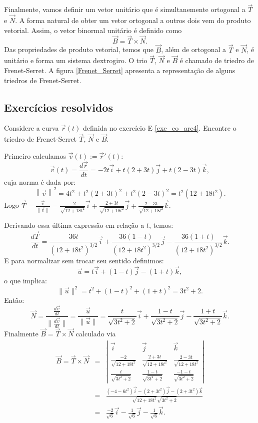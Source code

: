 Finalmente, vamos definir um vetor unitário que é simultanemente ortogonal a $\vec{T}$ e $\vec{N}$. A forma natural de obter um vetor ortogonal a outros dois vem do produto vetorial. Assim, o vetor binormal unitário é definido como
$$
\vec{B}=\vec{T}\times\vec{N}.
$$
Das propriedades de produto vetorial, temos que $\vec{B}$, além de ortogonal a $\vec{T}$ e $\vec{N}$, é unitário e forma um sistema dextrogiro. O trio $\vec{T}$, $\vec{N}$ e $\vec{B}$ é chamado de triedro de Frenet-Serret. A figura \ref{Frenet_Serret} apresenta a representação de alguns triedros de Frenet-Serret.


\subsection*{Exercícios resolvidos} %

\begin{exeresol}
  Considere a curva $\vec{r}(t)$ definida no exercício E \ref{exe_co_arc4}. Encontre o triedro de Frenet-Serret $\vec{T}$, $\vec{N}$ e $\vec{B}$.
\end{exeresol}
\begin{resol}
  Primeiro calculamos $\vec{v}(t):=\vec{r}\!'(t)$:
 $$\vec{v}(t) = \frac{d \vec{r}}{dt} = -2t \vec{i} + t(2+3t) \vec{j} + t(2-3t)\vec{k},$$
 cuja norma é dada por:
  $$\left\|\vec{v} \right\|^2 = 4t^2 + t^2(2+3t)^2 + t^2(2-3t)^2 = t^2(12+18t^2).$$
  Logo $\vec{T} = \frac{\vec{v}}{\|\vec{v}\|} = \frac{-2 }{\sqrt{12+18t^2}}\vec{i} + \frac{2+3t}{\sqrt{12+18t^2}}\vec{j} + \frac{2-3t}{\sqrt{12+18t^2}}\vec{k}$.

  Derivando essa última expressão em relação a $t$, temos:
  $$\frac{d\vec{T}}{dt} = \frac{36t}{(12+18t^2)^{3/2}} \vec{i} + \frac{36(1-t)}{(12+18t^2)^{3/2}} \vec{j} - \frac{36(1+t)}{(12+18t^2)^{3/2}} \vec{k}.$$
    E para normalizar sem trocar seu sentido definimos:
    $$\vec{u} = t \vec{i} + (1-t) \vec{j} - (1+t)\vec{k},$$
    o que implica: $$\|\vec{u}\|^2=t^2 + (1-t)^2 + (1+t)^2 = 3t^2 + 2.$$
    Então:
     $$\vec{N} = \frac{\frac{d\vec{v}}{dt}}{\|\frac{d\vec{v}}{dt}\|} = \frac{\vec{u}}{\|\vec{u}\|}=\frac{t}{\sqrt{3t^2+2}} \vec{i} + \frac{1-t}{\sqrt{3t^2+2}} \vec{j} - \frac{1+t}{\sqrt{3t^2+2}} \vec{k}.$$
     Finalmente $ \vec{B} = \vec{T} \times \vec{N}$ calculado via \begin{eqnarray*}
      \vec{B} = \vec{T} \times \vec{N} &=&
      \left| \begin{array}{ccc}
\vec{i} & \vec{j} & \vec{k} \\
\frac{-2}{\sqrt{12+18t^2}} & \frac{2+3t}{\sqrt{12+18t^2}} & \frac{2-3t}{\sqrt{12+18t^2}} \\
\frac{t}{\sqrt{3t^2+2}} & \frac{1-t}{\sqrt{3t^2+2}} &  \frac{-1-t}{\sqrt{3t^2+2}} \end{array} \right|\\ &=& \frac{(-4-6t^2)\vec{i} - (2+3t^2)\vec{j} - (2+3t^2)\vec{k}}{ \sqrt{12+18t^2} \sqrt{3t^2+2}}\\
&=& \frac{-2}{\sqrt{6}} \vec{i} - \frac{1}{\sqrt{6}} \vec{j} - \frac{1}{\sqrt{6}} \vec{k}.
\end{eqnarray*}
\end{resol}

